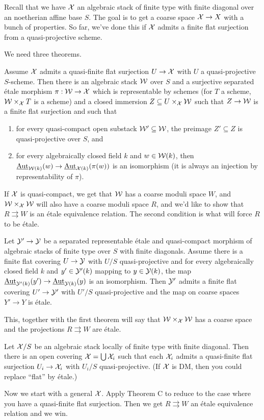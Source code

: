 

Recall that we have $\mathcal{X}$ an algebraic stack of finite type with
finite diagonal over an noetherian affine base $S$. The goal is to
get a coarse space $\mathcal{X}\to X$ with a bunch of properties. So far,
we've done this if $\mathcal{X}$ admits a finite flat surjection from a
quasi-projective scheme.

We need three theorems.

\begin{theorem}
  Assume $\mathcal{X}$ admits a quasi-finite flat surjection $U\to \mathcal{X}$ with
$U$ a quasi-projective $S$-scheme. Then there is an algebraic stack
$\mathcal{W}$ over $S$ and a surjective separated \'etale morphism $\pi:\mathcal{W}\to
\mathcal{X}$ which is representable by schemes (for $T$ a scheme, $\mathcal{W}\times_{\mathcal{X}}
T$ is a scheme) and a closed immersion $Z\subseteq U\times_{\mathcal{X}}\mathcal{W}$ such
that $Z\to \mathcal{W}$ is a finite flat surjection and such that
  \begin{enumerate}
   \item for every quasi-compact open substack $\mathcal{W}'\subseteq \mathcal{W}$, the
preimage $Z'\subseteq Z$ is quasi-projective over $S$, and
   \item for every algebraically closed field $k$ and $w\in \mathcal{W}(k)$,
then $\operatorname{\underline{Aut}}_{\mathcal{W}(k)}(w)\to \operatorname{\underline{Aut}}_{\mathcal{X}(k)}(\pi(w))$ is an isomorphism (it
is always an injection by representability of $\pi$).
  \end{enumerate}
\end{theorem}
If $\mathcal{X}$ is quasi-compact, we get that $\mathcal{W}$ has a coarse moduli space
$W$, and $\mathcal{W}\times_{\mathcal{X}} \mathcal{W}$ will also have a coarse moduli space $R$,
and we'd like to show that $R\rightrightarrows W$ is an \'etale
equivalence relation. The second condition is what will force $R$ to
be \'etale.
\begin{theorem}[B]
  Let $\mathcal{Y}'\to \mathcal{Y}$ be a separated representable \'etale and
quasi-compact morphism of algebraic stacks of finite type over $S$
with finite diagonals. Assume there is a finite flat covering $U\to
\mathcal{Y}$ with $U/S$ quasi-projective and for every algebraically closed
field $k$ and $y'\in \mathcal{Y}'(k)$ mapping to $y\in \mathcal{Y}(k)$, the map
$\operatorname{\underline{Aut}}_{\mathcal{Y}'(k)}(y')\to \operatorname{\underline{Aut}}_{\mathcal{Y}(k)}(y)$ is an isomorphism. Then $\mathcal{Y}'$
admits a finite flat covering $U'\to \mathcal{Y}'$ with $U'/S$
quasi-projective and the map on coarse spaces $Y'\to Y$ is \'etale.
\end{theorem}
This, together with the first theorem will say that $\mathcal{W}\times_{\mathcal{X}} \mathcal{W}$
has a coarse space and the projections $R\rightrightarrows W$ are
\'etale.
\begin{theorem}[C]
  Let $\mathcal{X}/S$ be an algebraic stack locally of finite type with finite
diagonal. Then there is an open covering $\mathcal{X}=\bigcup \mathcal{X}_i$ such that
each $\mathcal{X}_i$ admits a quasi-finite flat surjection $U_i\to \mathcal{X}_i$ with
$U_i/S$ quasi-projective. (If $\mathcal{X}$ is DM, then you could replace
``flat'' by \'etale.)
\end{theorem}
Now we start with a general $\mathcal{X}$. Apply Theorem C to reduce to the
case where you have a quasi-finite flat surjection. Then we get
$R\rightrightarrows W$ an \'etale equivalence relation and we win.

